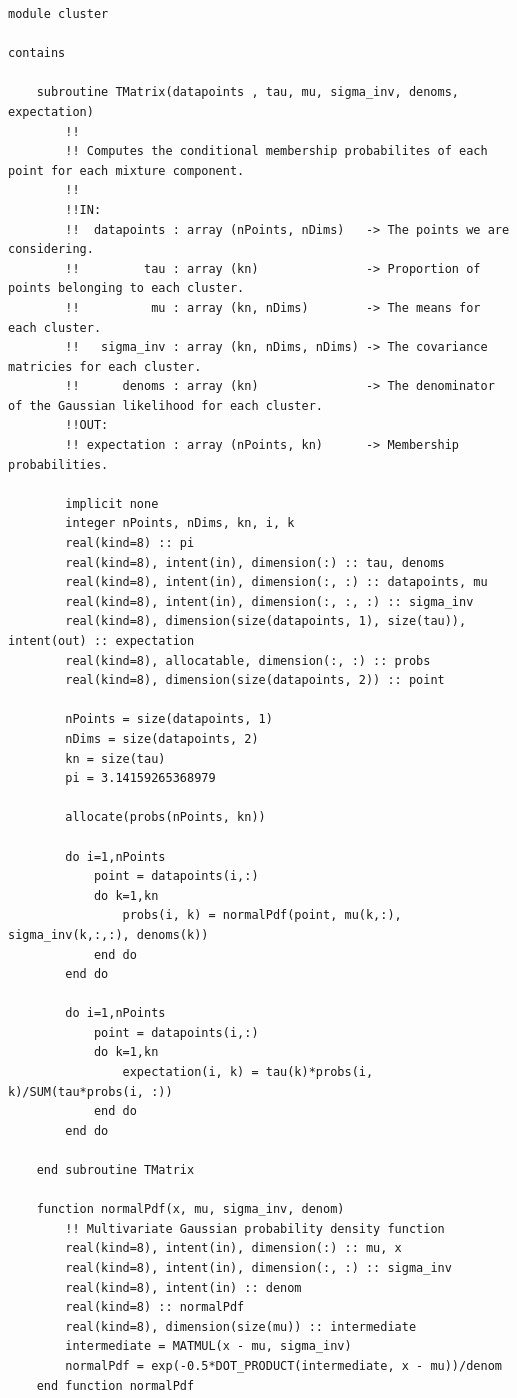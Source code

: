 \documentclass[a4paper]{article}
\begin{document}
\begin{verbatim}
module cluster

contains

    subroutine TMatrix(datapoints , tau, mu, sigma_inv, denoms, expectation)
        !!
        !! Computes the conditional membership probabilites of each point for each mixture component.
        !!
        !!IN:
        !!  datapoints : array (nPoints, nDims)   -> The points we are considering.
        !!         tau : array (kn)               -> Proportion of points belonging to each cluster.
        !!          mu : array (kn, nDims)        -> The means for each cluster.
        !!   sigma_inv : array (kn, nDims, nDims) -> The covariance matricies for each cluster.
        !!      denoms : array (kn)               -> The denominator of the Gaussian likelihood for each cluster.
        !!OUT:
        !! expectation : array (nPoints, kn)      -> Membership probabilities.
       
        implicit none
        integer nPoints, nDims, kn, i, k
        real(kind=8) :: pi
        real(kind=8), intent(in), dimension(:) :: tau, denoms
        real(kind=8), intent(in), dimension(:, :) :: datapoints, mu
        real(kind=8), intent(in), dimension(:, :, :) :: sigma_inv
        real(kind=8), dimension(size(datapoints, 1), size(tau)), intent(out) :: expectation
        real(kind=8), allocatable, dimension(:, :) :: probs
        real(kind=8), dimension(size(datapoints, 2)) :: point

        nPoints = size(datapoints, 1)
        nDims = size(datapoints, 2)
        kn = size(tau)
        pi = 3.14159265368979

        allocate(probs(nPoints, kn))

        do i=1,nPoints
            point = datapoints(i,:)
            do k=1,kn
                probs(i, k) = normalPdf(point, mu(k,:), sigma_inv(k,:,:), denoms(k))
            end do
        end do

        do i=1,nPoints
            point = datapoints(i,:)
            do k=1,kn
                expectation(i, k) = tau(k)*probs(i, k)/SUM(tau*probs(i, :))
            end do
        end do
        
    end subroutine TMatrix

    function normalPdf(x, mu, sigma_inv, denom)
        !! Multivariate Gaussian probability density function
        real(kind=8), intent(in), dimension(:) :: mu, x
        real(kind=8), intent(in), dimension(:, :) :: sigma_inv
        real(kind=8), intent(in) :: denom
        real(kind=8) :: normalPdf
        real(kind=8), dimension(size(mu)) :: intermediate
        intermediate = MATMUL(x - mu, sigma_inv)
        normalPdf = exp(-0.5*DOT_PRODUCT(intermediate, x - mu))/denom
    end function normalPdf



\end{verbatim}
\end{document}
